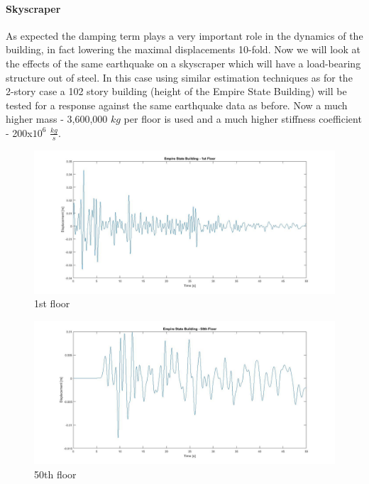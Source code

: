 \documentclass{article}
\begin{document}
	\paragraph{Skyscraper}As expected the damping term plays a very important role in the dynamics of the building, in fact lowering the maximal displacements 10-fold. Now we will look at the effects of the same earthquake on a skyscraper which will have a load-bearing structure out of steel. In this case using similar estimation techniques as for the 2-story case a 102 story building (height of the Empire State Building) will be tested for a response against the same earthquake data as before. Now a much higher mass - 3,600,000 $kg$ per floor is used and a much higher stiffness coefficient - 200x$10^6$ $\frac{kg}{s}$.
				

				\begin{figure}[h!]
   					\centering
   					\includegraphics[width=142mm]{EmpireState.jpg}
					\caption{1st floor}
					\label{EmpireState}
  				\end{figure}

				\begin{figure}[h!]
   					\centering
					\includegraphics[width=142mm]{EmpireState50.jpg}
					\caption{50th floor}
					\label{EmpireState50}
  				\end{figure}
\end{document}
